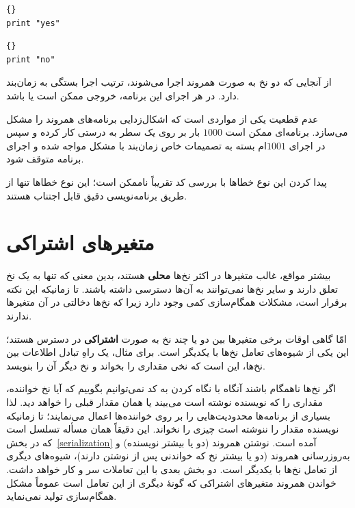 \documentclass{book}
\begin{document}
\begin{latin}
\begin{minipage}[t]{2in}
\begin{latin}
\begin{lstlisting}[title=\rl{نخ \lr{A}}]{}
print "yes"
\end{lstlisting}
\end{latin}
\end{minipage}
\hfill
\begin{minipage}[t]{2in}
\begin{latin}
\begin{lstlisting}[title=\rl{نخ \lr{‌B}}]{}
print "no"
\end{lstlisting}
\end{latin}
\end{minipage}
\end{latin}

    از آنجایی که دو نخ به صورت همروند اجرا می‌شوند، ترتیب اجرا بستگی به زمان‌بند دارد. در هر اجرای این برنامه، خروجی ممکن است 
      یا 
     باشد. 
     
    عدم قطعیت یکی از مواردی است که اشکال‌زدایی برنامه‌های همروند را مشکل می‌سازد. برنامه‌ای ممکن است $1000$ بار بر روی یک سطر به درستی 
    کار کرده و سپس در اجرای $1001$ام بسته به تصمیمات خاص زمان‌بند با مشکل مواجه شده و اجرای برنامه متوقف شود. 
    
    پیدا کردن این نوع خطاها با بررسی کد تقریباً ناممکن است؛  این نوع  خطاها تنها از طریق برنامه‌نویسی دقیق قابل اجتناب هستند. 


\section {متغیرهای اشتراکی}
\label{shared}

    بیشتر مواقع، غالب متغیرها در اکثر نخ‌ها \textbf{محلی} هستند، بدین معنی که تنها به یک نخ تعلق دارند و 
    سایر نخ‌ها نمی‌توانند به آن‌ها دسترسی داشته باشند. تا زمانیکه این نکته برقرار است، مشکلات همگام‌سازی کمی وجود دارد زیرا که 
    نخ‌ها دخالتی در آن متغیرها ندارند. 

    امّا گاهی اوقات برخی متغیرها بین دو یا چند نخ به صورت \textbf{اشتراکی} در دسترس هستند؛ این 
    یکی از شیوه‌های تعامل نخ‌ها با یکدیگر است. برای مثال، یک راهِ  تبادل اطلاعات بین نخ‌ها، این است که نخی مقداری را بخواند و نخ دیگر آن را بنویسد. 
    
    اگر نخ‌ها ناهمگام باشند آنگاه با نگاه کردن به کد نمی‌توانیم بگوییم که آیا نخ خواننده، مقداری را که نویسنده نوشته است می‌بیند یا همان مقدار قبلی را خواهد دید. 
    لذا بسیاری از برنامه‌ها محدودیت‌هایی را بر روی خواننده‌ها اعمال می‌نمایند؛ تا زمانیکه نویسنده مقدار را ننوشته است چیزی را نخواند. 
    این دقیقاً همان مسأله تسلسل است که در بخش~\ref{serialization} آمده است. 
    نوشتن همروند (دو یا بیشتر نویسنده) و به‌روزرسانی همروند (دو یا بیشتر نخ که خواندنی پس از نوشتن دارند)، شیوه‌های دیگری از تعامل 
    نخ‌ها با یکدیگر است. دو بخش بعدی با این تعاملات سر و کار خواهد داشت. خواندن همروند متغیرهای اشتراکی که گونهٔ دیگری از این تعامل است 
    عموماً مشکل همگام‌سازی تولید نمی‌نماید. 
\end{document}
